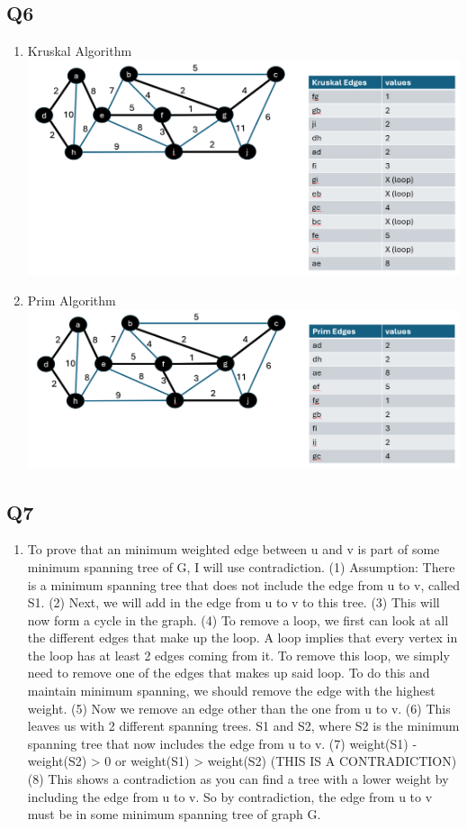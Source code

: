 \documentclass{article}
\begin{document}
\subsection*{Q6}
\begin{enumerate}[label=(\alph*)]
    \item Kruskal Algorithm
    \subitem \includegraphics[width=.75\textwidth]{kruskal.png}
    \item Prim Algorithm
    \subitem \includegraphics[width=.75\textwidth]{prims.png}
\end{enumerate}

\subsection*{Q7}
\begin{enumerate}[label=(\alph*)]
    \item To prove that an minimum weighted edge between u and v is part of some minimum spanning tree of G, I will use contradiction.
    \subitem (1) Assumption: There is a minimum spanning tree that does not include the edge from u to v, called S1.
    \subitem (2) Next, we will add in the edge from u to v to this tree.
    \subitem (3) This will now form a cycle in the graph.
    \subitem (4) To remove a loop, we first can look at all the different edges that make up the loop. A loop implies that every vertex in the loop has at least 2 edges coming from it. To remove this loop, we simply need to remove one of the edges that makes up said loop. To do this and maintain minimum spanning, we should remove the edge with the highest weight.
    \subitem (5) Now we remove an edge other than the one from u to v.
    \subitem (6) This leaves us with 2 different spanning trees. S1 and S2, where S2 is the minimum spanning tree that now includes the edge from u to v.
    \subitem (7) weight(S1) - weight(S2) > 0 or  weight(S1) > weight(S2) (THIS IS A CONTRADICTION)
    \subitem (8) This shows a contradiction as you can find a tree with a lower weight by including the edge from u to v. So by contradiction, the edge from u to v must be in some minimum spanning tree of graph G.
\end{enumerate}
\end{document}
